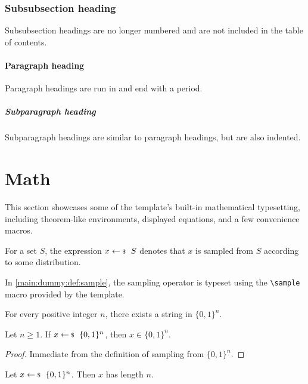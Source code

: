 \subsubsection{Subsubsection heading} Subsubsection headings are no longer
numbered and are not included in the table of contents.

\paragraph{Paragraph heading} Paragraph headings are run in and end with a
period.

\subparagraph{Subparagraph heading} Subparagraph headings are similar to
paragraph headings, but are also indented.

\section{Math}\label{main:dummy:math}

This section showcases some of the template's built-in mathematical
typesetting, including theorem-like environments, displayed equations, and a
few convenience macros.

\begin{definition}[Sampling]\label{main:dummy:def:sample}
  For a set \(S\), the expression \(x \sample S\) denotes that \(x\) is sampled from
  \(S\) according to some distribution.
\end{definition}

\begin{remark}\label{main:dummy:rmk:sample}
  In \cref{main:dummy:def:sample}, the sampling operator is typeset using the
  \verb|\sample| macro provided by the template.
\end{remark}

\begin{axiom}\label{main:dummy:ax:toy}
  For every positive integer \(n\), there exists a string in \(\{0,1\}^n\).
\end{axiom}

\begin{lemma}\label{main:dummy:lem:toy}
  Let \(n \ge 1\). If \(x \sample \{0,1\}^n\), then \(x \in \{0,1\}^n\).
\end{lemma}
\begin{proof}
  Immediate from the definition of sampling from \(\{0,1\}^n\).
\end{proof}

\begin{proposition}\label{main:dummy:prop:toy}
  Let \(x \sample \{0,1\}^n\). Then \(x\) has length \(n\).
\end{proposition}

